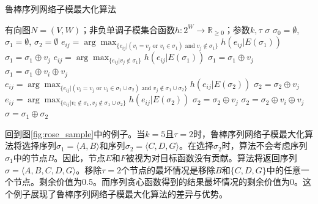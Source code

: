 \begin{algorithm}[H]
    \caption{鲁棒序列网络子模最大化算法 \label{alg:rosenets}}
    \begin{algorithmic}[1]
        \REQUIRE 有向图\(N = (V,W)\)；非负单调子模集合函数\(h: 2^W \rightarrow \mathbb{R}_{\ge 0}\)；参数$k, \tau$
        \ENSURE $\sigma$
        \STATE $\sigma_0=\emptyset$, $\sigma_1=\emptyset$, $\sigma_2=\emptyset$\;
         \label{alg:rose_line1}
                \STATE$e_{ij}=\arg\max_{\{e_{ij}|(v_i=v_j \text{ or } v_i \in \sigma_1) \text{ and } v_j\notin \sigma_1\}} h(e_{ij}|E(\sigma_1))$\;
                \STATE$\sigma_1 = \sigma_1 \oplus v_j$\;
            \ELSE
                \STATE $e_{ij}=\arg\max_{\{e_{ij}|v_j\notin \sigma_1\}} h(e_{ij}|E(\sigma_1))$\;
                    \STATE $\sigma_1 = \sigma_1 \oplus v_j$\;
                \ELSE
                    \STATE $\sigma_1 = \sigma_1 \oplus v_i \oplus v_j$\;
                \ENDIF
            \ENDIF
        \ENDWHILE \label{alg:rose_line2}
         \label{alg:rose_line3}
                \STATE $e_{ij}=\arg\max_{\{e_{ij}|(v_i=v_j \text{ or } v_i \in \sigma_1 \cup \sigma_2) \text{ and } v_j \notin \sigma_1 \cup \sigma_2\}} h(e_{ij}|E(\sigma_2))$\;
                \STATE $\sigma_2 = \sigma_2 \oplus v_j$\;
            \ELSE
                \STATE $e_{ij}=\arg\max_{\{e_{ij}|v_i\notin \sigma_1, v_j \notin \sigma_1 \cup \sigma_2\}} h(e_{ij}|E(\sigma_2))$\;
                    \STATE$\sigma_2 = \sigma_2 \oplus v_j$\;
                \ELSE
                    \STATE $\sigma_2 = \sigma_2 \oplus v_i \oplus v_j$\;
                \ENDIF
            \ENDIF
        \ENDWHILE \label{alg:rose_line4}
        \STATE $\sigma=\sigma_1\oplus \sigma_2$\;
    \end{algorithmic}
\end{algorithm}

回到图\ref{fig:rose_sample}中的例子。当\(k=5\)且\(\tau=2\)时，鲁棒序列网络子模最大化算法将选择序列\(\sigma_1=\langle A,B \rangle\)和序列\(\sigma_2=\langle C,D,G \rangle\)。在选择\(\sigma_2\)时，算法不会考虑序列\(\sigma_1\)中的节点\(B\)。因此，节点\(E\)和\(F\)被视为对目标函数没有贡献。算法将返回序列\(\sigma=\langle A,B,C,D,G \rangle\)。移除\(\tau=2\)个节点的最坏情况是移除\(B\)和\(\{C,D,G\}\)中的任意一个节点。剩余价值为0.5。而序列贪心函数得到的结果最坏情况的剩余价值为0。这个例子展现了鲁棒序列网络子模最大化算法的差异与优势。

